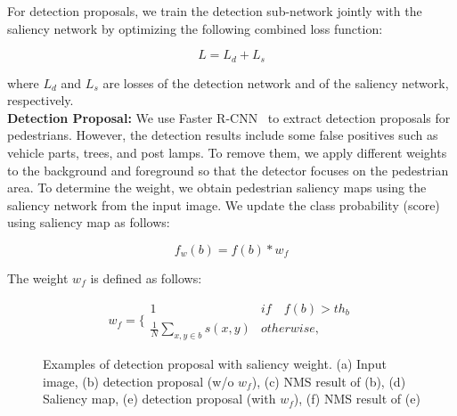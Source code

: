 \documentclass[journal]{IEEEtran}
\begin{document}
For detection proposals, we train the detection sub-network jointly with the saliency network by optimizing the following combined loss function:

\begin{equation}
L = L_{d} + L_{s}
\end{equation}

where $L_{d}$ and $L_{s}$ are losses of the detection network and of the saliency network, respectively. \\

\textbf{Detection Proposal:} We use Faster R-CNN~\cite{ren2015faster} to extract detection proposals for pedestrians. However, the detection results include some false positives such as vehicle parts, trees, and post lamps. To remove them, we apply different weights to the background and foreground so that the detector focuses on the pedestrian area. To determine the weight, we obtain pedestrian saliency maps using the saliency network from the input image. We update the class probability (score) using saliency map as follows:

\begin{equation}
	f_{w}(b) = f(b)* w_{f}
\end{equation}

The weight $w_{f}$ is defined as follows:

\begin{equation}
w_{f} = \lbrace
\begin{array}{cl}
1 & if \quad  f(b) > th_{b} \\
\frac{1}{N}\sum_{x,y \in b}s(x,y) & otherwise,
\end{array}
\end{equation}

\begin{figure}[t]
\centering
{}

\caption{Examples of detection proposal with saliency weight. (a) Input image, (b) detection proposal (w/o $w_{f}$), (c) NMS result of (b), (d) Saliency map, (e) detection proposal (with $w_{f}$), (f) NMS result of (e) }
\label{fig:withSal}
\end{figure}
\end{document}
